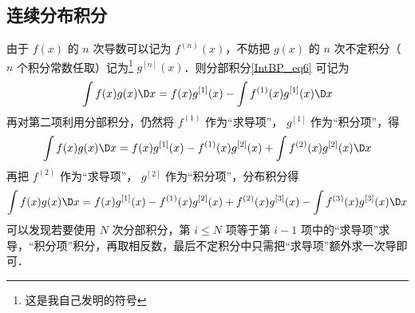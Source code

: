 \subsection{连续分布积分}
由于 $f(x)$ 的 $n$ 次导数可以记为 ${f^{(n)}}(x)$，不妨把 $g(x)$ 的 $n$ 次不定积分（ $n$ 个积分常数任取）记为\footnote{这是我自己发明的符号} ${g^{[n]}}(x)$．则分部积分\autoref{IntBP_eq6} 可记为
\begin{equation}
\int {f(x)g(x)\D x}  = f(x){g^{[1]}}(x) - \int {{f^{(1)}}(x){g^{[1]}}(x)\D x}
\end{equation}
再对第二项利用分部积分，仍然将 ${f^{(1)}}$ 作为“求导项”， ${g^{[1]}}$ 作为“积分项”，得
\begin{equation}
\int {f(x)g(x)\D x}  = f(x){g^{[1]}}(x) - {f^{(1)}}(x){g^{[2]}}(x) + \int {{f^{(2)}}(x){g^{[2]}}(x)\D x}
\end{equation}
再把 $f^{(2)}$ 作为“求导项”， $g^{[2]}$ 作为“积分项”，分布积分得
\begin{equation}
\int {f(x)g(x)\D x}  = f(x){g^{[1]}}(x) - {f^{(1)}}(x){g^{[2]}}(x) + {f^{(2)}}(x){g^{[3]}}(x) - \int {{f^{(3)}}(x){g^{[3]}}(x)\D x}
\end{equation}
可以发现若要使用 $N$ 次分部积分，第 $i\le N$ 项等于第 $i-1$ 项中的“求导项”求导，“积分项”积分，再取相反数，最后不定积分中只需把“求导项”额外求一次导即可． 

